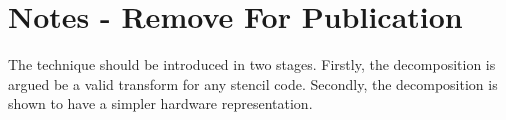 \section{Notes - Remove For Publication}
The technique should be introduced in two stages. 
Firstly, the decomposition is argued be a valid transform for any stencil code.
Secondly, the decomposition is shown to have a simpler hardware representation.

